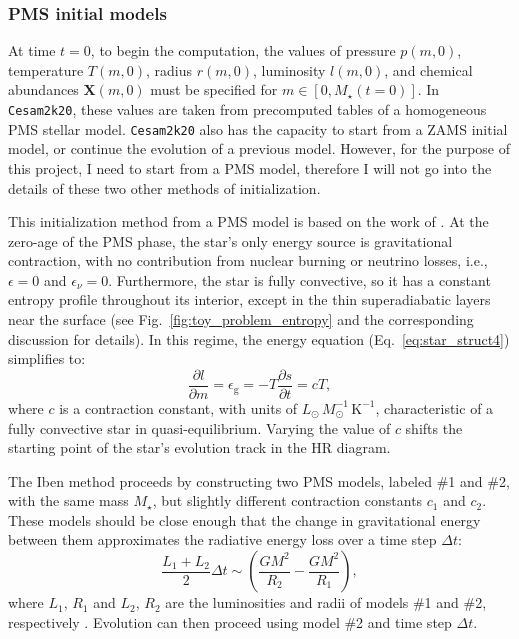 \documentclass[12pt,a4paper]{article}
\newcommand{\mr}{\mathrm}
\newcommand{\pfird}[2][]{\frac{\partial#1}{\partial#2}}
\newcommand{\bvec}[1]{\boldsymbol{#1}}
\begin{document}
\subsubsection{PMS initial models}
\label{sec:pms_initial_models}

At time $t = 0$, to begin the computation, the values of pressure $p(m, 0)$, temperature $T(m, 0)$, radius $r(m, 0)$, luminosity $l(m, 0)$, and chemical abundances $\bvec{X}(m, 0)$ must be specified for $m \in [0, M_\star(t=0)]$. In \texttt{Cesam2k20}, these values are taken from precomputed tables of a homogeneous PMS stellar model. \texttt{Cesam2k20} also has the capacity to start from a ZAMS initial model, or continue the evolution of a previous model. However, for the purpose of this project, I need to start from a PMS model, therefore I will not go into the details of these two other methods of initialization. 

This initialization method from a PMS model is based on the work of \textcite{Iben1965a}. At the zero-age of the PMS phase, the star's only energy source is gravitational contraction, with no contribution from nuclear burning or neutrino losses, i.e., $\epsilon = 0$ and $\epsilon_\nu = 0$. Furthermore, the star is fully convective, so it has a constant entropy profile throughout its interior, except in the thin superadiabatic layers near the surface (see Fig.~\ref{fig:toy_problem_entropy} and the corresponding discussion for details). In this regime, the energy equation (Eq.~\eqref{eq:star_struct4}) simplifies to:
\begin{equation}
  \pfird[l]{m} = \epsilon_\mr{g} = -T\pfird[s]{t} = cT,
\end{equation}
where $c$ is a contraction constant, with units of $L_\odot\,M_\odot^{-1}\,\mr{K}^{-1}$, characteristic of a fully convective star in quasi-equilibrium. Varying the value of $c$ shifts the starting point of the star's evolution track in the HR diagram.

The Iben method proceeds by constructing two PMS models, labeled \#1 and \#2, with the same mass $M_\star$, but slightly different contraction constants $c_1$ and $c_2$. These models should be close enough that the change in gravitational energy between them approximates the radiative energy loss over a time step $\Delta t$:
\begin{equation}
  \frac{L_1 + L_2}{2}\Delta t \sim \left(\frac{GM^2}{R_2} - \frac{GM^2}{R_1}\right),
\end{equation}
where $L_1$, $R_1$ and $L_2$, $R_2$ are the luminosities and radii of models \#1 and \#2, respectively \parencite[cf. Eq.~(13)][]{Morel1997}. Evolution can then proceed using model \#2 and time step $\Delta t$.
\end{document}
